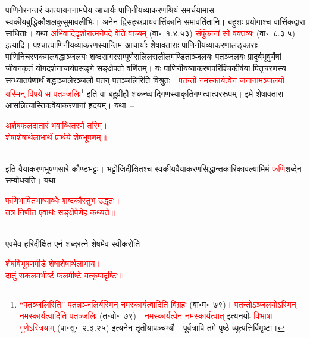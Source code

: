 \begin{sloppypar}\justifying\noindent\hspace{10mm} पाणिनेरनन्तरं कात्यायन\-नामधेय आचार्यः पाणिनीय\-व्याकरण\-श्रियं समर्चयामास स्वकीय\-बुद्धि\-कौशल\-कुसुमावलीभिः। अनेन द्वि\-सहस्र\-प्राय\-वार्त्तिकानि समावर्तितानि। बहुशः प्रयोगाश्च वार्त्तिक\-द्वारा साधिताः। यथा \textcolor{red}{अभिवादि\-दृशोरात्मनेपदे वेति वाच्यम्} (वा॰~१.४.५३) \textcolor{red}{संपुंकानां सो वक्तव्यः} (वा॰~८.३.५) इत्यादि। पश्चात्पाणिनीय\-व्याकरणस्यान्तिम आचार्याः शेषावताराः पाणिनीय\-व्याकरणालङ्काराः पाणिनि\-चरण\-कमल\-बद्धाञ्जलयः शब्द\-सागर\-सम्पूर्ण\-सलिल\-सलील\-मण्डिताञ्जलयः पतञ्जलयः प्रादुर्बभूवुर्येषां जीवन\-कृतं योग\-दर्शनाचार्य\-प्रसङ्गे सङ्क्षेपतो वर्णितम्। यः पाणिनीय\-व्याकरण\-परिश्चिकीर्षया पितृ\-चरणस्य सन्ध्या\-तर्पणार्थं बद्धाञ्जलेरञ्जलौ पतन् पतञ्जलिरिति विश्रुतः। \textcolor{red}{पतन्तो नमस्कार्यत्वेन जनानामञ्जलयो यस्मिन् विषये स पतञ्जलिः}\footnote{\textcolor{red}{“पतञ्जलिरिति” पतन्नञ्जलिर्यस्मिन् नमस्कार्यत्वादिति विग्रहः} (बा॰म॰~७९)। \textcolor{red}{पतन्तोऽञ्जलयोऽस्मिन् नमस्कार्यत्वादिति पतञ्जलिः} (त॰बो॰~७९)। \textcolor{red}{नमस्कार्यत्वेन नमस्कार्यत्वात्} इत्यनयोः \textcolor{red}{विभाषा गुणेऽस्त्रियाम्‌} (पा॰सू॰~२.३.२५) इत्यनेन तृतीया\-पञ्चम्यौ। पूर्वत्रापि \pageref{text:patanjali}तमे पृष्ठे व्युत्पत्तिर्विमृष्टा।} इति वा बहुव्रीहौ शकन्ध्वादि\-गणस्याकृति\-गणत्वात्पर\-रूपम्। इमे शेषावतारा आसन्नित्यास्तिक\-वैयाकरणानां हृदयम्। यथा~–\end{sloppypar}
\centering\textcolor{red}{अशेषफलदातारं भवाब्धितरणे तरिम्।\nopagebreak\\
शेषाशेषार्थलाभार्थं प्रार्थये शेषभूषणम्॥}\nopagebreak\\
\\
\begin{sloppypar}\justifying\noindent इति वैयाकरण\-भूषण\-सारे कौण्डभट्टः। भट्टोजिदीक्षितश्च स्वकीय\-वैयाकरण\-सिद्धान्त\-कारिकावल्यामिमं \textcolor{red}{फणि}\-शब्देन सम्बोधयति। यथा~–\end{sloppypar}
\centering\textcolor{red}{फणिभाषितभाष्याब्धेः शब्दकौस्तुभ उद्धृतः। \nopagebreak\\
तत्र निर्णीत एवार्थः सङ्क्षेपेणेह कथ्यते॥}\nopagebreak\\
\\
\begin{sloppypar}\justifying\noindent एवमेव हरि\-दीक्षित एनं शब्दरत्ने शेषमेव स्वीकरोति~–\end{sloppypar}
\centering\textcolor{red}{शेषविभूषणमीडे शेषाशेषार्थलाभाय।\nopagebreak\\
दातुं सकलमभीष्टं फलमीष्टे यत्कृपादृष्टिः॥}\nopagebreak\\
